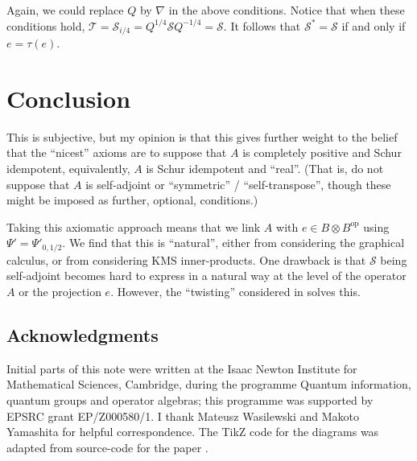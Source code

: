 \documentclass[a4paper,11pt]{article}
\theoremstyle{plain}
\theoremstyle{remark}
\newcommand{\mc}[1]{\mathcal{#1}}
\newcommand{\op}{{\operatorname{op}}}
\begin{document}
Again, we could replace $Q$ by $\nabla$ in the above conditions.  Notice that when these conditions hold, $\mc T = \mc S_{i/4} = Q^{1/4}\mc S Q^{-1/4} = \mc S$.  It follows that $\mc S^* = \mc S$ if and only if $e = \tau(e)$.




\section{Conclusion}

This is subjective, but my opinion is that this gives further weight to the belief that the ``nicest'' axioms are to suppose that $A$ is completely positive and Schur idempotent, equivalently, $A$ is Schur idempotent and ``real''.  (That is, do not suppose that $A$ is self-adjoint or ``symmetric'' / ``self-transpose'', though these might be imposed as further, optional, conditions.)

Taking this axiomatic approach means that we link $A$ with $e\in B\otimes B^\op$ using $\Psi' = \Psi'_{0,1/2}$.  We find that this is ``natural'', either from considering the graphical calculus, or from considering KMS inner-products.  One drawback is that $\mc S$ being self-adjoint becomes hard to express in a natural way at the level of the operator $A$ or the projection $e$.  However, the ``twisting'' considered in \cite{Wasilewski_Quantum_Cayley} solves this.

\subsection{Acknowledgments}

Initial parts of this note were written at the Isaac Newton Institute for Mathematical Sciences, Cambridge, during the programme Quantum information, quantum groups and operator algebras; this programme was supported by EPSRC grant EP/Z000580/1.  I thank Mateusz Wasilewski and Makoto Yamashita for helpful correspondence.  The TikZ code for the diagrams was adapted from source-code for the paper \cite{matsuda_class_m2}.




\end{document}
